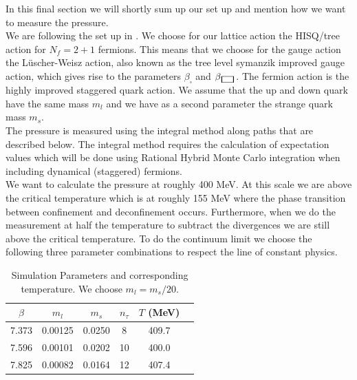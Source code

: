 In this final section we will shortly sum up our set up and mention how we want to measure the pressure.\\
We are following the set up in \cite{eos2_1}. We choose for our lattice action the HISQ/tree action for $N_f=2+1$ fermions. This means that we choose for the gauge action the Lüscher-Weisz action, also known as the tree level symanzik improved gauge action, which gives rise to the parameters $\beta_\square$ and $\beta_\rectangle$. The fermion action is the highly improved staggered quark action. We assume that the up and down quark have the same mass $m_l$ and we have as a second parameter the strange quark mass $m_s$.\\
The pressure is measured using the integral method along paths that are described below. The integral method requires the calculation of expectation values which will be done using Rational Hybrid Monte Carlo integration when including dynamical (staggered) fermions.\\
We want to calculate the pressure at roughly 400 MeV. At this scale we are above the critical temperature which is at roughly 155 MeV where the phase transition between confinement and deconfinement occurs. Furthermore, when we do the measurement at half the temperature to subtract the divergences we are still above the critical temperature. To do the continuum limit we choose the following three parameter combinations to respect the line of constant physics.
\begin{table}[h]
\centering
\begin{tabular}{c c c c c c}
\hline
$\beta$ & $m_l$ & $m_s$ & $n_\tau$ & $T$ (MeV) \\
\hline
7.373 & 0.00125 & 0.0250 & 8  & 409.7 \\
7.596 & 0.00101 & 0.0202 & 10 & 400.0 \\
7.825 & 0.00082 & 0.0164 & 12 & 407.4 \\
\hline
\end{tabular}
\caption{Simulation Parameters and corresponding temperature. We choose $m_l=m_s/20$.}
\label{tab:lattice_params}
\end{table}

